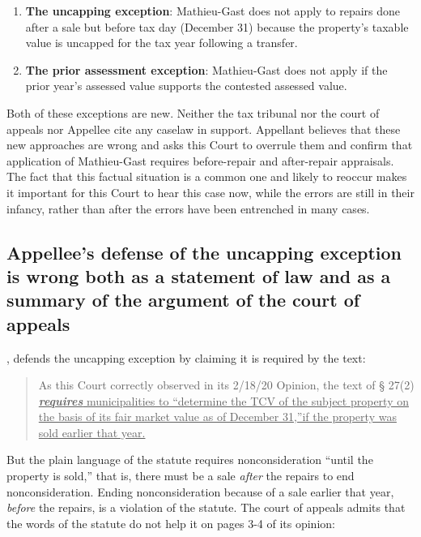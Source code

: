 \documentclass[12pt,\documentclassflag]{michiganCourtOfAppealsBrief}
\begin{document}
\begin{enumerate}
\item {\bfseries The uncapping exception}: Mathieu-Gast does not apply to repairs done after a sale but before tax day (December 31) because the property's taxable value is uncapped for the tax year following a transfer.
\item {\bfseries The prior assessment exception}: Mathieu-Gast does not apply if the prior year's assessed value supports the contested assessed value.
\end{enumerate}

Both of these exceptions are new. Neither the tax tribunal nor the court of appeals nor Appellee cite any caselaw in support. Appellant believes that these new approaches are wrong and asks this Court to overrule them and confirm that application of Mathieu-Gast requires before-repair and after-repair appraisals.
The fact that this factual situation is a common one and likely to reoccur makes it important for this Court to hear this case now, while the errors are still in their infancy, rather than after the errors have been entrenched in many cases.

\subsection{Appellee's defense of the uncapping exception is wrong both as a statement of law and as a summary of the argument of the court of appeals}

, defends the uncapping exception by claiming it is required by the text:

\begin{quote}
  As this Court correctly observed in its 2/18/20 Opinion, the text of § 27(2)
\ul{\emph{\textbf{requires}} municipalities to ``determine the TCV of the subject property on the basis of its fair market
  value as of December 31,''if the property was sold earlier that year.}
\end{quote}

But the plain language of the statute requires nonconsideration ``until the property is sold,'' that is, there must be a sale \emph{after} the repairs to end nonconsideration. Ending nonconsideration because of a sale earlier that year, \emph{before} the repairs, is a violation of the statute.
The court of appeals admits that the words of the statute do not help it on pages 3-4 of its opinion:
\end{document}
